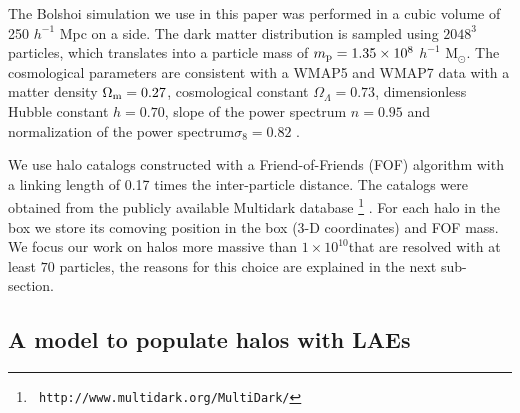\documentclass[usenatbib]{mn2e}
\newcommand{\hMsun}{{\ifmmode{h^{-1}{\rm
        {M_{\odot}}}}\else{$h^{-1}{\rm{M_{\odot}}}$}\fi}}
\begin{document}
The Bolshoi simulation \citep{Bolshoi} we use in this paper was
performed in a cubic volume of 250 $h^{-1}$ Mpc on a side. The
dark matter distribution is sampled using $2048^{3}$ particles, which
translates into a particle mass of $m_{\rm   p}=1.35\times 10^{8}$
$h^{-1}$ M$_{\odot}$.  The cosmological parameters are consistent with
a WMAP5 and WMAP7 data with a matter density $\Omega_{\rm m} = 0.27$,
cosmological constant $\Omega_{\Lambda}=0.73$, dimensionless Hubble constant
$h=0.70$, slope of the power spectrum $n=0.95$ and normalization of the
power spectrum$\sigma_{8}=0.82$ \citep{Komatsu2009,Jarosik2011}.  

We use halo catalogs constructed with a Friend-of-Friends (FOF)
algorithm with a linking length of 0.17 times the inter-particle
distance. The catalogs were obtained from the publicly available
Multidark database \footnote{{\tt
    http://www.multidark.org/MultiDark/}}
\citep{MultiDark}. For each halo in the box we store its
comoving position in the box (3-D coordinates) and FOF mass. We focus our work
on halos more massive than $1\times 10^{10}$\hMsun that are resolved
with at least $70$ particles, the reasons for this choice are
explained in the next sub-section.  


\subsection{A model to populate halos with LAEs}
\label{subsec:mocks}
\end{document}
